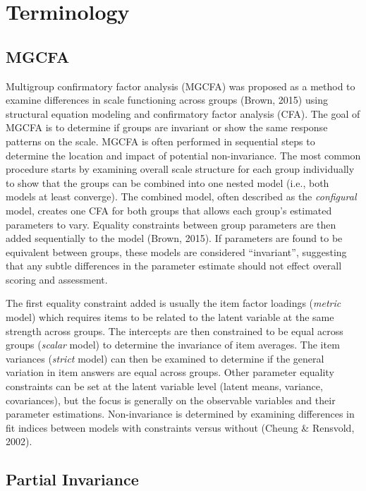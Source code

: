 \documentclass[
  man,floatsintext]{apa7}
\begin{document}
\section{Terminology}\label{terminology}

\subsection{MGCFA}\label{mgcfa}

Multigroup confirmatory factor analysis (MGCFA) was proposed as a method to examine differences in scale functioning across groups (Brown, 2015) using structural equation modeling and confirmatory factor analysis (CFA). The goal of MGCFA is to determine if groups are invariant or show the same response patterns on the scale. MGCFA is often performed in sequential steps to determine the location and impact of potential non-invariance. The most common procedure starts by examining overall scale structure for each group individually to show that the groups can be combined into one nested model (i.e., both models at least converge). The combined model, often described as the \emph{configural} model, creates one CFA for both groups that allows each group's estimated parameters to vary. Equality constraints between group parameters are then added sequentially to the model (Brown, 2015). If parameters are found to be equivalent between groups, these models are considered ``invariant'', suggesting that any subtle differences in the parameter estimate should not effect overall scoring and assessment.

The first equality constraint added is usually the item factor loadings (\emph{metric} model) which requires items to be related to the latent variable at the same strength across groups. The intercepts are then constrained to be equal across groups (\emph{scalar} model) to determine the invariance of item averages. The item variances (\emph{strict} model) can then be examined to determine if the general variation in item answers are equal across groups. Other parameter equality constraints can be set at the latent variable level (latent means, variance, covariances), but the focus is generally on the observable variables and their parameter estimations. Non-invariance is determined by examining differences in fit indices between models with constraints versus without (Cheung \& Rensvold, 2002).

\subsection{Partial Invariance}\label{partial-invariance}
\end{document}
